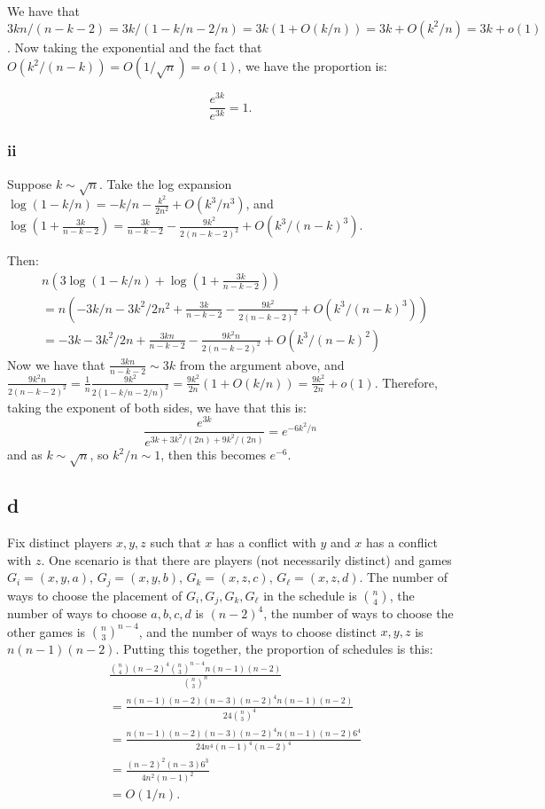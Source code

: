\documentclass[]{article}
\theoremstyle{definition}
\numberwithin{theorem}{section}
\numberwithin{equation}{section}
\begin{document}
We have that $3kn/(n - k - 2) = 3k/(1 - k/n - 2/n) = 3k(1 + O(k/n)) = 3k + O(k^2/n) =  3k + o(1)$. 
Now taking the exponential and the fact that $O(k^2/(n - k)) = O(1/\sqrt{n}) = o(1)$, we have the proportion is:

\begin{equation}
	\frac{e^{3k}}{e^{3k}} = 1. 
\end{equation}

\subsubsection{ii}
Suppose $k \sim \sqrt{n}$. 
Take the log expansion 
$\log(1 - k/n)  = -k/n - \frac{k^2}{2n^2} + O(k^3/n^3)$, and $\log\left(1 + \frac{3k}{n - k - 2}\right) = \frac{3k}{n - k - 2} - \frac{9k^2}{2(n - k - 2)^2} + O(k^3/(n - k)^3)$. 

Then:
\begin{align*}
	&n \left( 3 \log(1 - k/n) + \log\left(1 + \frac{3k}{n - k - 2}\right)\right) \\
	&= n \left(-3k/n - 3k^2/2n^2 + \frac{3k}{n - k - 2} - \frac{9k^2}{2(n - k - 2)^2} + O(k^3/(n - k)^3)\right)\\
	&= -3k - 3k^2/2n + \frac{3kn}{n - k - 2} - \frac{9k^2 n}{2(n - k - 2)^2} + O(k^3/(n - k)^2)
\end{align*}
Now we have that $\frac{3kn}{n - k - 2}  \sim 3k$ from the argument above, and $\frac{9k^2 n}{2(n - k - 2)^2} = \frac{1}{n} \frac{9 k^2}{2(1 - k/n - 2/n)^2} = \frac{9k^2}{2n}(1 + O(k/n)) = \frac{9k^2}{2n} + o(1)$. Therefore, taking the exponent of both sides, we have that this is:
\begin{equation}
	\frac{e^{3k} }{e^{3k + 3k^2/(2n) + 9k^2/(2n)}} = e^{-6 k^2/n}
\end{equation}
and as $k \sim \sqrt{n}$, so $k^2/n \sim 1$, then this becomes $e^{-6}$. 

\subsection{d}
Fix distinct players $x, y, z$ such that $x$ has a conflict with $y$ and $x$ has a conflict with $z$. One scenario is that there are players (not necessarily distinct) and games $G_i = (x, y, a)$, $G_j = (x, y, b)$, $G_k = (x, z, c)$, $G_\ell = (x, z, d)$. 
The number of ways to choose the placement of $G_i, G_j, G_k, G_\ell$ in the schedule is $\binom{n}{4}$, the number of ways to choose $a, b, c, d$ is $(n - 2)^4$, the number of ways to choose the other games is $\binom{n}{3}^{n - 4}$, and the number of ways to choose distinct $x, y, z$ is $n(n - 1)(n-2)$. Putting this together, the proportion of schedules is this:
\begin{align*}
	&\frac{\binom{n}{4} (n-2)^4 \binom{n}{3}^{n - 4} n (n-1)(n-2)}{\binom{n}{3}^n}\\
	&= \frac{n(n-1)(n-2)(n-3) (n-2)^4 n (n-1)(n-2)}{24 \binom{n}{3}^4}\\
	&= \frac{n(n-1)(n-2)(n-3) (n-2)^4 n (n-1)(n-2) 6^4 }{24 n^4 (n-1)^4 (n-2)^4}\\
	&= \frac{(n - 2)^2 (n - 3) 6^3}{4 n^2 (n-1)^2}\\
	&= O(1/n).
\end{align*}
\end{document}
